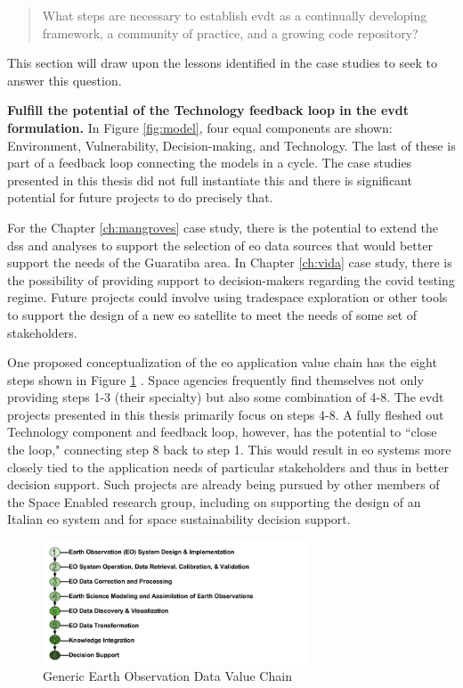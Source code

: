 \blockquote{What steps are necessary to establish \ac{evdt} as a continually developing framework, a community of practice, and a growing code repository?}

This section will draw upon the lessons identified in the case studies to seek to answer this question. 

\textbf{Fulfill the potential of the Technology feedback loop in the \ac{evdt} formulation.} In Figure \ref{fig:model}, four equal components are shown: Environment, Vulnerability, Decision-making, and Technology. The last of these is part of a feedback loop connecting the models in a cycle. The case studies presented in this thesis did not full instantiate this and there is significant potential for future projects to do precisely that. 

For the Chapter \ref{ch:mangroves} case study, there is the potential to extend the \ac{dss} and analyses to support the selection of \ac{eo} data sources that would better support the needs of the Guaratiba area. In Chapter \ref{ch:vida} case study, there is the possibility of providing support to decision-makers regarding the \ac{covid} testing regime. Future projects could involve using tradespace exploration or other tools to support the design of a new \ac{eo} satellite to meet the needs of some set of stakeholders.  

One proposed conceptualization of the \ac{eo} application value chain has the eight steps shown in Figure \ref{fig:eochain}  \cite{hakimdavarTransboundaryWaterImproving2018, woodPartnershipsEnableEarth2017}. Space agencies frequently find themselves not only providing steps 1-3 (their specialty) but also some combination of 4-8. The \ac{evdt} projects presented in this thesis primarily focus on steps 4-8. A fully fleshed out Technology component and feedback loop, however, has the potential to ``close the loop," connecting step 8 back to step 1. This would result in \ac{eo} systems more closely tied to the application needs of particular stakeholders and thus in better decision support. Such projects are already being pursued by other members of the Space Enabled research group, including on supporting the design of an Italian \ac{eo} system and for space sustainability decision support.

\begin{figure}[ht]
    \centering
    \includegraphics[width=0.7\textwidth]{Figures/chap7/EOChain.jpg}
    \caption{Generic Earth Observation Data Value Chain}
    \label{fig:eochain}
\end{figure}

